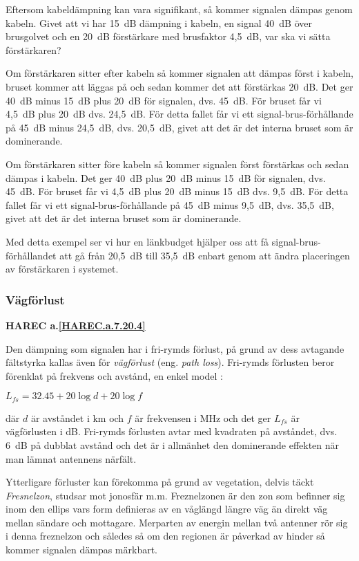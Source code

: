 Eftersom kabeldämpning kan vara signifikant, så kommer signalen dämpas genom
kabeln.
Givet att vi har 15~dB dämpning i kabeln, en signal 40~dB över brusgolvet och
en 20~dB förstärkare med brusfaktor 4,5~dB, var ska vi sätta förstärkaren?

Om förstärkaren sitter efter kabeln så kommer signalen att dämpas först i
kabeln, bruset kommer att läggas på och sedan kommer det att förstärkas 20~dB.
Det ger 40~dB minus 15~dB plus 20~dB för signalen, dvs. 45~dB.
För bruset får vi 4,5~dB plus 20~dB dvs. 24,5~dB.
För detta fallet får vi ett signal-brus-förhållande på 45~dB minus 24,5~dB,
dvs. 20,5~dB, givet att det är det interna bruset som är dominerande.

Om förstärkaren sitter före kabeln så kommer signalen först förstärkas och
sedan dämpas i kabeln.
Det ger 40~dB plus 20~dB minus 15~dB för signalen, dvs. 45~dB.
För bruset får vi 4,5~dB plus 20~dB minus 15~dB dvs. 9,5~dB.
För detta fallet får vi ett signal-brus-förhållande på 45~dB minus 9,5~dB,
dvs. 35,5~dB, givet att det är det interna bruset som är dominerande.

Med detta exempel ser vi hur en länkbudget hjälper oss att få
signal-brus-förhållandet att gå från 20,5~dB till 35,5~dB enbart genom att
ändra placeringen av förstärkaren i systemet.

\subsubsection{Vägförlust}
\textbf{HAREC a.\ref{HAREC.a.7.20.4}\label{myHAREC.a.7.20.4}}

Den dämpning som signalen har i fri-rymds förlust, på grund av dess avtagande
fältstyrka kallas även för \emph{vägförlust} (eng. \emph{path loss}).
Fri-rymds förlusten beror förenklat på frekvens och avstånd, en enkel model
\cite[\S 19.1.2]{ARRLHDB2015}:

\(L_{fs} = 32.45 + 20\log d + 20\log f\)

där \(d\) är avståndet i km och \(f\) är frekvensen i MHz och det ger
\(L_{fs}\) är vägförlusten i dB.
Fri-rymds förlusten avtar med kvadraten på avståndet, dvs. 6~dB på dubblat
avstånd och det är i allmänhet den dominerande effekten när man lämnat
antennens närfält.

Ytterligare förluster kan förekomma på grund av vegetation, delvis täckt
\emph{Fresnelzon}, studsar mot jonosfär m.m.
Freznelzonen är den zon som befinner sig inom den ellips vars form definieras
av en våglängd längre väg än direkt väg mellan sändare och mottagare.
Merparten av energin mellan två antenner rör sig i denna freznelzon och
således så om den regionen är påverkad av hinder så kommer signalen dämpas
märkbart.

